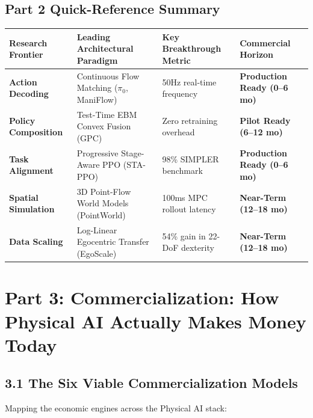\documentclass[11pt,a4paper]{article}
\begin{document}
\subsection*{Part 2 Quick-Reference Summary}
\begin{table}[h!]
\centering
\scriptsize
\begin{tabularx}{\textwidth}{@{}l p{4.5cm} p{3.2cm} X@{}}
\toprule
\textbf{Research Frontier} & \textbf{Leading Architectural Paradigm} & \textbf{Key Breakthrough Metric} & \textbf{Commercial Horizon} \\
\midrule
\textbf{Action Decoding} & Continuous Flow Matching ($\pi_0$, ManiFlow) & 50Hz real-time frequency & \textcolor{successgreen}{\textbf{Production Ready (0--6 mo)}} \\
\textbf{Policy Composition} & Test-Time EBM Convex Fusion (GPC) & Zero retraining overhead & \textcolor{primary}{\textbf{Pilot Ready (6--12 mo)}} \\
\textbf{Task Alignment} & Progressive Stage-Aware PPO (STA-PPO) & 98\% SIMPLER benchmark & \textcolor{successgreen}{\textbf{Production Ready (0--6 mo)}} \\
\textbf{Spatial Simulation} & 3D Point-Flow World Models (PointWorld) & 100ms MPC rollout latency & \textcolor{accentgold}{\textbf{Near-Term (12--18 mo)}} \\
\textbf{Data Scaling} & Log-Linear Egocentric Transfer (EgoScale) & 54\% gain in 22-DoF dexterity & \textcolor{accentgold}{\textbf{Near-Term (12--18 mo)}} \\
\bottomrule
\end{tabularx}
\end{table}

\section{Part 3: Commercialization: How Physical AI Actually Makes Money Today}

\subsection{3.1 The Six Viable Commercialization Models}
Mapping the economic engines across the Physical AI stack:
\end{document}

